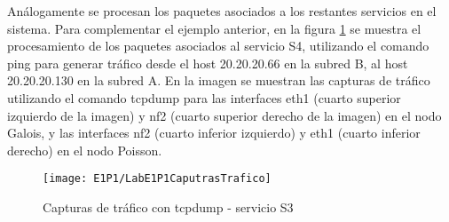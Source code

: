 Análogamente se procesan los paquetes asociados a los restantes servicios en el sistema. Para complementar el ejemplo anterior, en la figura \ref{fig:LabE1P1CapsTraf2} se muestra el procesamiento de los paquetes asociados al servicio S4, utilizando el comando ping para generar tr\'afico desde el host 20.20.20.66 en la subred B, al host 20.20.20.130 en la subred A. En la imagen se muestran las capturas de tr\'afico utilizando el comando tcpdump para las interfaces eth1 (cuarto superior izquierdo de la imagen) y nf2 (cuarto superior derecho de la imagen) en el nodo Galois, y las interfaces nf2  
 (cuarto inferior izquierdo) y eth1 (cuarto inferior derecho) en el nodo Poisson.\\


\begin{figure}[ht!] 
\centering    
\texttt{[image: E1P1/LabE1P1CaputrasTrafico]}
\caption[Capturas de tr\'afico con tcpdump - servicio S3]{Capturas de tr\'afico con tcpdump - servicio S3}
\label{fig:LabE1P1CapsTraf2}
\end{figure}



%
%
%
%
%
%

